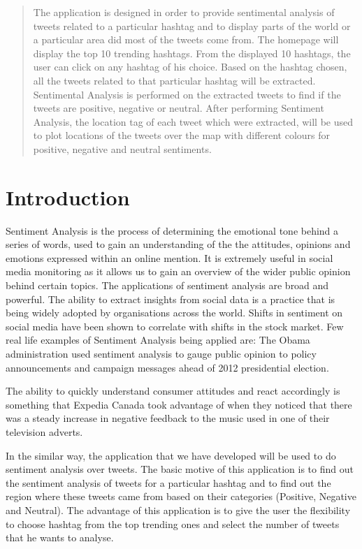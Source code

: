 \documentclass[12pt]{article}
\begin{document}
\begin{abstract}
The application is designed in order to provide sentimental analysis of tweets related to a particular hashtag and to display parts of the world or a particular area did most of the tweets come from. The homepage will display the top 10 trending hashtags. From the displayed 10 hashtags, the user can click on any hashtag of his choice. Based on the hashtag chosen, all the tweets related to that particular hashtag will be extracted. Sentimental Analysis is performed on the extracted tweets to find if the tweets are positive, negative or neutral. After performing Sentiment Analysis, the location tag of each tweet which were extracted, will be used to plot locations of the tweets over the map with different colours for positive, negative and neutral sentiments.
\vfill
\end{abstract}
\newpage
\section{Introduction}

Sentiment Analysis is the process of determining the emotional tone behind a series of words, used to gain an understanding of the the attitudes, opinions and emotions expressed within an online mention. It  is extremely useful in social media monitoring as it allows us to gain an overview of the wider public opinion behind certain topics. The applications of sentiment analysis are broad and powerful. The ability to extract insights from social data is a practice that is being widely adopted by organisations across the world. Shifts in sentiment on social media have been shown to correlate with shifts in the stock market. 
Few real life examples of Sentiment Analysis being applied are:
The Obama administration used sentiment analysis to gauge public opinion to policy announcements and campaign messages ahead of 2012 presidential election.

The ability to quickly understand consumer attitudes and react accordingly is something that Expedia Canada took advantage of when they noticed that there was a steady increase in negative feedback to the music used in one of their television adverts.

In the similar way, the application that we have developed will be used to do sentiment analysis over tweets. The basic motive of this application is to find out the sentiment analysis of  tweets for a particular hashtag and to find out the region where these tweets came from based on their categories (Positive, Negative and Neutral).
The advantage of this application is to give the user the flexibility to choose hashtag from the top trending ones and select the number of tweets that he wants to analyse.
\newpage
\end{document}
